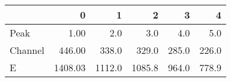 \begin{tabular}{lrrrrr}
\toprule
{} &        0 &       1 &       2 &      3 &      4 \\
\midrule
Peak    &     1.00 &     2.0 &     3.0 &    4.0 &    5.0 \\
Channel &   446.00 &   338.0 &   329.0 &  285.0 &  226.0 \\
E       &  1408.03 &  1112.0 &  1085.8 &  964.0 &  778.9 \\
\bottomrule
\end{tabular}
